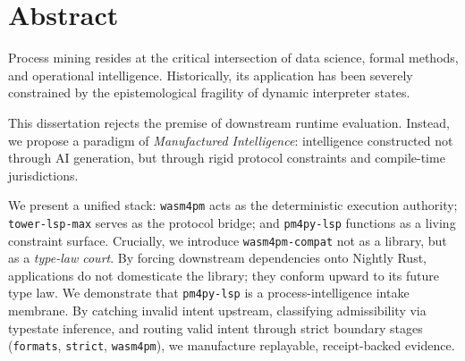 
\chapter*{Abstract}
Process mining resides at the critical intersection of data science, formal methods, and operational intelligence. Historically, its application has been severely constrained by the epistemological fragility of dynamic interpreter states.

This dissertation rejects the premise of downstream runtime evaluation. Instead, we propose a paradigm of \textit{Manufactured Intelligence}: intelligence constructed not through AI generation, but through rigid protocol constraints and compile-time jurisdictions. 

We present a unified stack: \texttt{wasm4pm} acts as the deterministic execution authority; \texttt{tower-lsp-max} serves as the protocol bridge; and \texttt{pm4py-lsp} functions as a living constraint surface. Crucially, we introduce \texttt{wasm4pm-compat} not as a library, but as a \textit{type-law court}. By forcing downstream dependencies onto Nightly Rust, applications do not domesticate the library; they conform upward to its future type law. We demonstrate that \texttt{pm4py-lsp} is a process-intelligence intake membrane. By catching invalid intent upstream, classifying admissibility via typestate inference, and routing valid intent through strict boundary stages (\texttt{formats}, \texttt{strict}, \texttt{wasm4pm}), we manufacture replayable, receipt-backed evidence.
